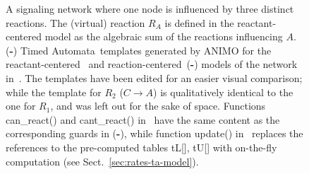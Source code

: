 \documentclass{llncs}
\newcommand{\ta}{Timed Automaton}
\newcommand{\tas}{Timed Automata}
\begin{document}
\begin{figure}[thb]
\begin{center}
  \end{center}\vspace{-.5cm}
  \caption{
{\bf\protect{}} A signaling network where one node is influenced by three distinct reactions.
The (virtual) reaction $R_A$ is defined in
the reactant-centered model as the algebraic sum of the reactions influencing $A$.
({\bf\protect{}\--{}\protect{}}) \tas\ templates generated by ANIMO for the reactant-centered~{\bf\protect{}}
 and reaction-centered~({\bf\protect{}\--{}\protect{}}) models of the network in~{\bf\protect{}}.
The templates have been edited for an easier visual comparison; while the template for $R_2$ ($C \rightarrow A$) is qualitatively identical to the one for $R_1$,
and was left out for the sake of space. Functions {\sf can\_react()} and {\sf cant\_react()}
in~{\protect{}} have the same content as the corresponding guards in ({\bf\protect{}\--{}\protect{}}),
while function {\sf update()} in~{\protect{}}
replaces the references to the pre-computed tables {\sf tL[]}, {\sf tU[]} with on-the-fly computation (see Sect.~\ref{sec:rates-ta-model}).
\label{fig:ta-models}}
\vspace{-1mm}
\end{figure}
\end{document}
